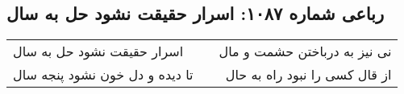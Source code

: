 \begin{center}
\section*{رباعی شماره ۱۰۸۷: اسرار حقیقت نشود حل به سال}
\label{sec:1087}
\begin{longtable}{l p{0.5cm} r}
اسرار حقیقت نشود حل به سال
&&
نی نیز به درباختن حشمت و مال
\\
تا دیده و دل خون نشود پنجه سال
&&
از قال کسی را نبود راه به حال
\\
\end{longtable}
\end{center}
